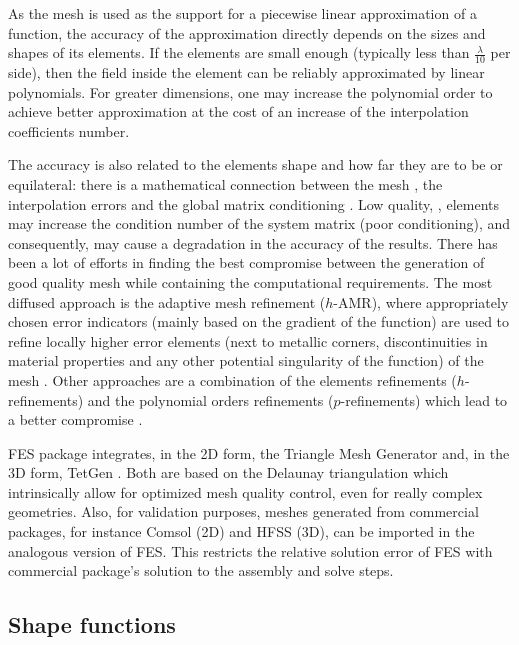 As the mesh is used as the support for a piecewise linear approximation of a function, the accuracy of the approximation directly depends on the sizes and shapes of its elements. If the elements are small enough (typically less than $\frac{\lambda}{10}$ per side), then the field inside the element can be reliably approximated by linear polynomials. For greater dimensions, one may increase the polynomial order to achieve better approximation at the cost of an increase of the interpolation coefficients number.

The accuracy is also related to the elements shape and how far they are to be  or equilateral: there is a mathematical connection between the mesh , the interpolation errors and the global matrix conditioning \cite{tsukerman1998comparison}. Low quality, , elements may increase the condition number of the system matrix (poor conditioning), and consequently, may cause a degradation in the accuracy of the results. There has been a lot of efforts in finding the best compromise between the generation of good quality mesh while containing the computational requirements. The most diffused approach is the adaptive mesh refinement ($h$-AMR), where appropriately chosen error indicators (mainly based on the gradient of the function) are used to refine locally higher error elements (next to metallic corners, discontinuities in material properties and any other potential singularity of the function) of the mesh \cite{sun2000adaptive,ingelstrom2004higher}. Other approaches are a combination of the elements refinements ($h$-refinements) and the polynomial orders refinements ($p$-refinements) which lead to a better compromise \cite{solin2010adaptive}.

FES package integrates, in the 2D form, the Triangle Mesh Generator \cite{shewchuk2002delaunay} and, in the 3D form, TetGen \cite{si2008three}. Both are based on the Delaunay triangulation which intrinsically allow for optimized mesh quality control, even for really complex geometries. Also, for validation purposes, meshes generated from commercial packages, for instance Comsol (2D) and HFSS (3D), can be imported  in the analogous version of FES. This restricts the relative solution error of FES with commercial package's solution to the assembly and solve steps.


\subsection{Shape functions}

